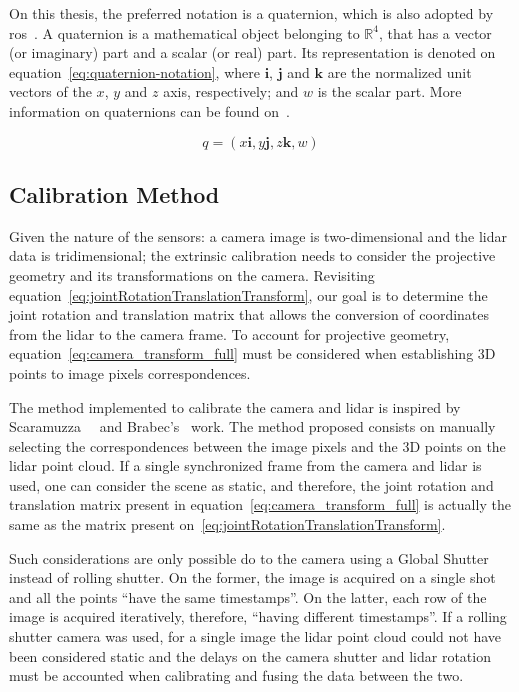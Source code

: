 On this thesis, the preferred notation is a quaternion, which is also adopted by \ac{ros}~\cite{Foote2014}. A quaternion is a mathematical object belonging to $\mathbb{R}^4$, that has a vector (or imaginary) part and a scalar (or real) part. Its representation is denoted on equation~\ref{eq:quaternion-notation}, where $\mathbf{i}$, $\mathbf{j}$ and $\mathbf{k}$ are the normalized unit vectors of the $x$, $y$ and $z$ axis, respectively; and $w$ is the scalar part. More information on quaternions can be found on~\cite{mvg_book}.

\begin{equation}
	\label{eq:quaternion-notation}
	q = (x\mathbf{i}, y\mathbf{j}, z\mathbf{k}, w)
\end{equation}

\subsection{Calibration Method}
Given the nature of the sensors: a camera image is two-dimensional and the \ac{lidar} data is tridimensional; the extrinsic calibration needs to consider the projective geometry and its transformations on the camera. Revisiting equation~\ref{eq:jointRotationTranslationTransform}, our goal is to determine the joint rotation and translation matrix that allows the conversion of coordinates from the \ac{lidar} to the camera frame. To account for projective geometry, equation~\ref{eq:camera_transform_full} must be considered when establishing 3D points to image pixels correspondences.

The method implemented to calibrate the camera and \ac{lidar} is inspired by Scaramuzza~\etal~\cite{Scaramuzza} and Brabec's~\cite{brabec2014} work. The method proposed consists on manually selecting the correspondences between the image pixels and the 3D points on the \ac{lidar} point cloud. If a single synchronized frame from the camera and \ac{lidar} is used, one can consider the scene as static, and therefore, the joint rotation and translation matrix present in equation~\ref{eq:camera_transform_full} is actually the same as the matrix present on~\ref{eq:jointRotationTranslationTransform}. 

Such considerations are only possible do to the camera using a Global Shutter instead of rolling shutter. On the former, the image is acquired on a single shot and all the points ``have the same timestamps''. On the latter, each row of the image is acquired iteratively, therefore, ``having different timestamps''. If a rolling shutter camera was used, for a single image the \ac{lidar} point cloud could not have been considered static and the delays on the camera shutter and \ac{lidar} rotation must be accounted when calibrating and fusing the data between the two.

